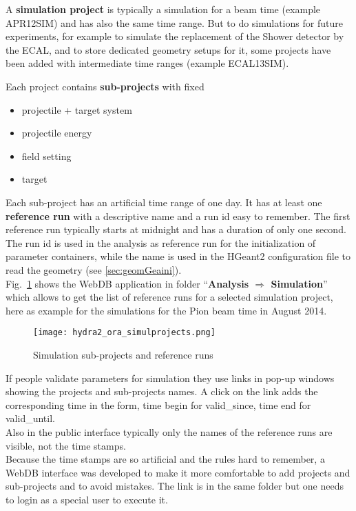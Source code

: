 A \textbf{simulation project} is typically a simulation for a beam time (example APR12SIM) and has also the same time range. 
But to do simulations for future experiments, for example to simulate the replacement of the Shower detector by the ECAL, 
and to store dedicated geometry setups for it, some projects have been added with intermediate time ranges (example ECAL13SIM).
\newpage

Each project contains \textbf{sub-projects} with fixed
\begin{itemize}
  \setlength{\itemsep}{0pt}    
  \item projectile + target system
  \item projectile energy
  \item field setting
  \item target
\end{itemize}
Each sub-project has an artificial time range of one day. It has at least one \textbf{reference run} with a descriptive 
name and a run id easy to remember. The first reference run typically starts at midnight and has a duration of only one 
second.\\ 
The run id is used in the analysis as reference run for the initialization of parameter containers, while the name is 
used in the HGeant2 configuration file to read the geometry (see \ref{sec:geomGeaini}).\\ 

Fig.~\ref{fig:oraSimulProjects} shows the WebDB application in folder ``\textbf{Analysis $\Rightarrow$ Simulation}'' which allows 
to get the list of reference runs for a selected simulation project, here as example for the simulations for the Pion 
beam time in August 2014. 
\begin{figure}[\htb]
  \centering
  \texttt{[image: hydra2\_ora\_simulprojects.png]}
  \caption[Simulation sub-projects and reference runs]{Simulation sub-projects and reference runs}
  \label{fig:oraSimulProjects}
\end{figure}

If people validate parameters for simulation they use links in pop-up windows showing the projects and sub-projects names. 
A click on the link adds the corresponding time in the form, time begin for valid\_since, time end for valid\_until.\\
Also in the public interface typically only the names of the reference runs are visible, not the time stamps.\\  

Because the time stamps are so artificial and the rules hard to remember, a WebDB interface was developed to make it 
more comfortable to add projects and sub-projects and to avoid mistakes. The link is in the same folder but one needs 
to login as a special user to execute it.


